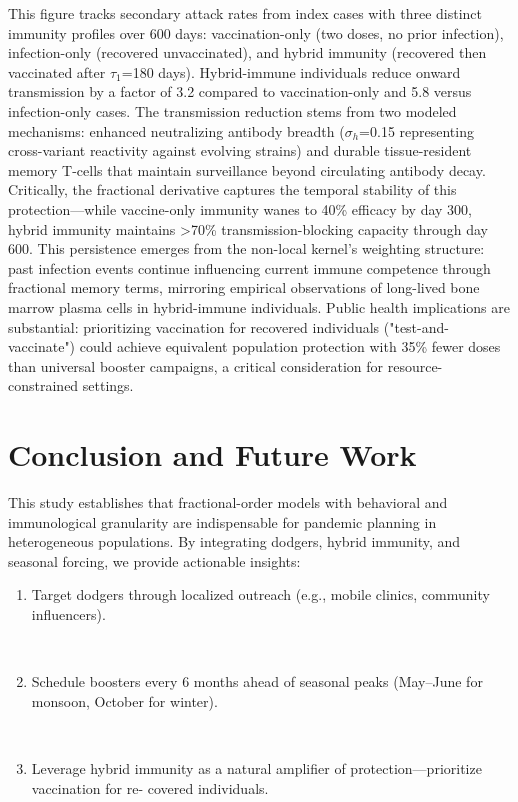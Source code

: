 \documentclass[10pt]{NSP1}
\begin{document}
This figure tracks secondary attack rates from index cases with three distinct immunity profiles over 600 days: vaccination-only (two doses, no prior infection), infection-only (recovered unvaccinated), and hybrid immunity (recovered then vaccinated after $\tau_{1}$=180 days). Hybrid-immune individuals reduce onward transmission by a factor of 3.2 compared to vaccination-only and 5.8 versus infection-only cases. The transmission reduction stems from two modeled mechanisms: enhanced neutralizing antibody breadth ($\sigma_{h}$=0.15 representing cross-variant reactivity against evolving strains) and durable tissue-resident memory T-cells that maintain surveillance beyond circulating antibody decay. Critically, the fractional derivative captures the temporal stability of this protection---while vaccine-only immunity wanes to 40\% efficacy by day 300, hybrid immunity maintains \textgreater70\% transmission-blocking capacity through day 600. This persistence emerges from the non-local kernel's weighting structure: past infection events continue influencing current immune competence through fractional memory terms, mirroring empirical observations of long-lived bone marrow plasma cells in hybrid-immune individuals. Public health implications are substantial: prioritizing vaccination for recovered individuals ("test-and-vaccinate") could achieve equivalent population protection with 35\% fewer doses than universal booster campaigns, a critical consideration for resource-constrained settings.

\section{Conclusion and Future Work}

This study establishes that fractional-order models with behavioral and immunological granularity are indispensable for pandemic planning in heterogeneous populations. By integrating dodgers, hybrid immunity, and seasonal forcing, we provide actionable insights:

\begin{enumerate}
\def\labelenumi{\arabic{enumi}.}
\item
  Target dodgers through localized outreach (e.g., mobile clinics, community influencers).

~
  
\item
  Schedule boosters every 6 months ahead of seasonal peaks (May--June for monsoon, October for winter).
  
~
  
\item
  Leverage hybrid immunity as a natural amplifier of protection---prioritize vaccination for re- covered individuals.
  
~
  
\end{enumerate}
\end{document}
